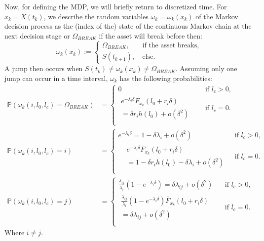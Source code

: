 \documentclass[a4paper]{thesis}
\theoremstyle{definition}
\begin{document}
Now, for defining the MDP, we will briefly return to discretized time.
For $x_k=X(t_k)$, we describe the random variables $\omega_k=\omega_k(x_k)$ of the Markov decision process as the (index of the) state of the continuous Markov chain at the next decision stage or $\Omega_{BREAK}$ if the asset will break before then:
\[
\omega_k(x_k):=\begin{cases}
\Omega_{BREAK},&\ \text{if the asset breaks,}\\
S(t_{k+1}),&\ \text{else.}
\end{cases}
\]
A jump then occurs when $S(t_k)\neq\omega_k(x_k)\neq\Omega_{BREAK}$.
Assuming only one jump can occur in a time interval, $\omega_k$ has the following probabilities:
\[
\begin{split}
\mathbb{P}(\omega_k(i,l_0,l_c)=\Omega_{BREAK})&=\begin{cases}
	0&\text{ if }l_c>0,\\
	\begin{split}
	e^{-\lambda_{i}\delta}F_{x_k}(l_0+r_i\delta)&\\
	=\delta r_ih(l_0)+o(\delta^2)&
	\end{split}&\text{ if }l_c=0.\\
\end{cases}\\
\mathbb{P}(\omega_k(i,l_0,l_c)=i)&=\begin{cases}
	e^{-\lambda_i \delta}=1-\delta\lambda_i+o(\delta^2)&\text{ if }l_c>0,\\
	\begin{split}
	&e^{-\lambda_i \delta} \bar{F}_{x_k}(l_0+r_i\delta)\\
	&=1-\delta r_ih(l_0)-\delta\lambda_i+o(\delta^2)
	\end{split}&\text{ if }l_c=0.\\
\end{cases}\\
\mathbb{P}(\omega_k(i,l_0,l_c)=j)&=\begin{cases}
	\frac{\lambda_{ij}}{\lambda_i}(1-e^{-\lambda_i \delta})=\delta\lambda_{ij}+o(\delta^2) & \text{ if }l_c>0,\\
	\begin{split}
	\frac{\lambda_{ij}}{\lambda_i}(1-e^{-\lambda_i \delta})\bar{F}_{x_k}(l_0+r_i\delta)&\\
	=\delta\lambda_{ij}+o(\delta^2)&
	\end{split}&\text{ if }l_c=0.\\
\end{cases}
\end{split}
\]
Where $i\neq j$.
\end{document}
